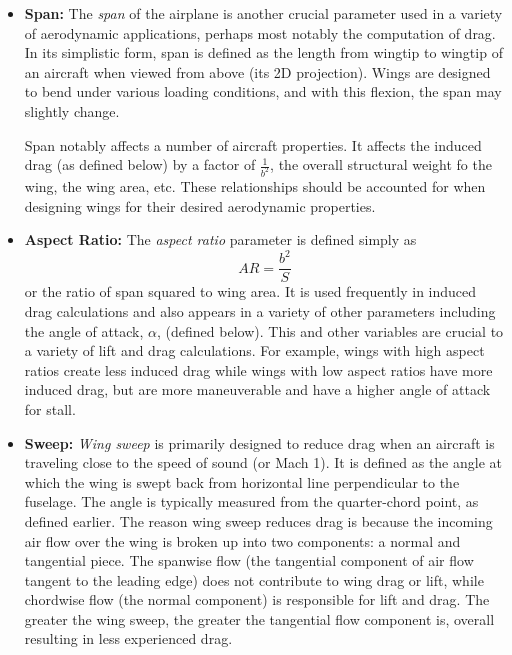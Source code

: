 \documentclass{report}
\begin{document}
\begin{itemize}
    \item[] \textbf{Span:} The \textit{span} of the airplane is another crucial parameter used in a variety of 
    aerodynamic applications, perhaps most notably the computation of drag. In its simplistic form, span is defined
    as the length from wingtip to wingtip of an aircraft when viewed from above (its 2D projection). Wings are designed to
    bend under various loading conditions, and with this flexion, the span may slightly change.

    Span notably affects a number of aircraft properties. It affects the induced drag (as defined below) by a factor
    of $\frac{1}{b^2}$, the overall structural weight fo the wing, the wing area, etc. These relationships
    should be accounted for when designing wings for their desired aerodynamic properties.

    \item[] \textbf{Aspect Ratio:} The \textit{aspect ratio} parameter is defined simply as
    \begin{equation}
    AR = \frac{b^2}{S}
    \end{equation}
    or the ratio of span squared to wing area. It is used frequently in induced drag calculations
    and also appears in a variety of other parameters including the angle of attack, $\alpha$, (defined below).
    This and other variables are crucial to a variety of lift and drag calculations. For example, wings with high aspect ratios create
    less induced drag while wings with low aspect ratios have more induced drag, but are more maneuverable and have a higher angle of attack for stall.

    \item[] \textbf{Sweep:} \textit{Wing sweep} is primarily designed to reduce drag when an aircraft is traveling
    close to the speed of sound (or Mach 1). It is defined as the angle at which the wing is swept back from horizontal
    line perpendicular to the fuselage. The angle is typically measured from the quarter-chord point, as defined earlier. The reason
    wing sweep reduces drag is because the incoming air flow over the wing is broken up into two components: a normal and tangential piece.
    The spanwise flow (the tangential component of air flow tangent to the leading edge) does not contribute to 
    wing drag or lift, while chordwise flow (the normal component) is responsible for lift and drag. The greater the wing sweep, the greater
    the tangential flow component is, overall resulting in less experienced drag.


\end{itemize}
\end{document}
